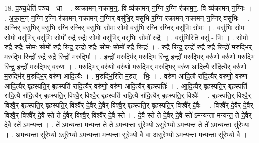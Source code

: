 \documentclass[17pt]{extarticle}
\begin{document}
18. प॒ञ्च॒धेति॑ पञ्च - धा । . व्य॑क्रामन् नक्राम॒न्॒. वि व्य॑क्रामन् न॒ग्नि र॒ग्नि र॑क्राम॒न्॒. वि व्य॑क्रामन् न॒ग्निः । . अ॒क्रा॒म॒न् न॒ग्नि र॒ग्नि र॑क्रामन् नक्रामन् न॒ग्निर् वसु॑भि॒र् वसु॑भि र॒ग्नि र॑क्रामन् नक्रामन् न॒ग्निर् वसु॑भिः । . अ॒ग्निर् वसु॑भि॒र् वसु॑भि र॒ग्नि र॒ग्निर् वसु॑भिः॒ सोमः॒ सोमो॒ वसु॑भि र॒ग्नि र॒ग्निर् वसु॑भिः॒ सोमः॑ । . वसु॑भिः॒ सोमः॒ सोमो॒ वसु॑भि॒र् वसु॑भिः॒ सोमो॑ रु॒द्रै रु॒द्रैः सोमो॒ वसु॑भि॒र् वसु॑भिः॒ सोमो॑ रु॒द्रैः । . वसु॑भि॒रिति॒ वसु॑ - भिः॒ । . सोमो॑ रु॒द्रै रु॒द्रैः सोमः॒ सोमो॑ रु॒द्रै रिन्द्र॒ इन्द्रो॑ रु॒द्रैः सोमः॒ सोमो॑ रु॒द्रै रिन्द्रः॑ । . रु॒द्रै रिन्द्र॒ इन्द्रो॑ रु॒द्रै रु॒द्रै रिन्द्रो॑ म॒रुद्भि॑र् म॒रुद्भि॒ रिन्द्रो॑ रु॒द्रै रु॒द्रै रिन्द्रो॑ म॒रुद्भिः॑ । . इन्द्रो॑ म॒रुद्भि॑र् म॒रुद्भि॒ रिन्द्र॒ इन्द्रो॑ म॒रुद्भि॒र् वरु॑णो॒ वरु॑णो म॒रुद्भि॒ रिन्द्र॒ इन्द्रो॑ म॒रुद्भि॒र् वरु॑णः । . म॒रुद्भि॒र् वरु॑णो॒ वरु॑णो म॒रुद्भि॑र् म॒रुद्भि॒र् वरु॑ण आदि॒त्यै रा॑दि॒त्यैर् वरु॑णो म॒रुद्भि॑र् म॒रुद्भि॒र् वरु॑ण आदि॒त्यैः । . म॒रुद्भि॒रिति॑ म॒रुत् - भिः॒ । . वरु॑ण आदि॒त्यै रा॑दि॒त्यैर् वरु॑णो॒ वरु॑ण आदि॒त्यैर् बृह॒स्पति॒र् बृह॒स्पति॑ रादि॒त्यैर् वरु॑णो॒ वरु॑ण आदि॒त्यैर् बृह॒स्पतिः॑ । . आ॒दि॒त्यैर् बृह॒स्पति॒र् बृह॒स्पति॑ रादि॒त्यै रा॑दि॒त्यैर् बृह॒स्पति॒र् विश्वै॒र् विश्वै॒र् बृह॒स्पति॑ रादि॒त्यै रा॑दि॒त्यैर् बृह॒स्पति॒र् विश्वैः᳚ । . बृह॒स्पति॒र् विश्वै॒र् विश्वै॒र् बृह॒स्पति॒र् बृह॒स्पति॒र् विश्वै᳚र् दे॒वैर् दे॒वैर् विश्वै॒र् बृह॒स्पति॒र् बृह॒स्पति॒र् विश्वै᳚र् दे॒वैः । . विश्वै᳚र् दे॒वैर् दे॒वैर् विश्वै॒र् विश्वै᳚र् दे॒वै स्ते ते दे॒वैर् विश्वै॒र् विश्वै᳚र् दे॒वै स्ते । . दे॒वै स्ते ते दे॒वैर् दे॒वै स्ते॑ ऽमन्यन्ता मन्यन्त॒ ते दे॒वैर् दे॒वै स्ते॑ ऽमन्यन्त । . ते॑ ऽमन्यन्ता मन्यन्त॒ ते ते॑ ऽमन्य॒न्ता सु॑रे॒भ्यो ऽसु॑रेभ्यो ऽमन्यन्त॒ ते ते॑ ऽमन्य॒न्ता सु॑रेभ्यः । . अ॒म॒न्य॒न्ता सु॑रे॒भ्यो ऽसु॑रेभ्यो ऽमन्यन्ता मन्य॒न्ता सु॑रेभ्यो॒ वै वा असु॑रेभ्यो ऽमन्यन्ता मन्य॒न्ता सु॑रेभ्यो॒ वै । \newline
\end{document}
